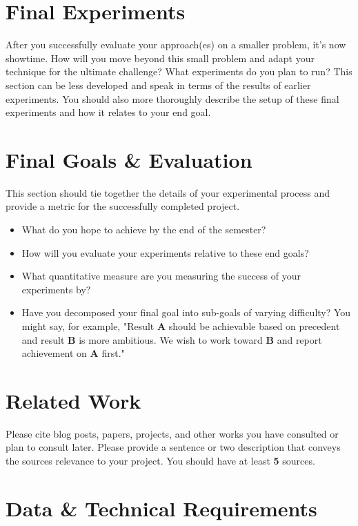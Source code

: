 \documentclass{article} %
\begin{document}
\section{Final Experiments}

After you successfully evaluate your approach(es) on a smaller problem, it's now showtime. How will you move beyond this small problem and adapt your technique for the ultimate challenge? What experiments do you plan to run? This section can be less developed and speak in terms of the results of earlier experiments. You should also more thoroughly describe the setup of these final experiments and how it relates to your end goal.

\section{Final Goals \& Evaluation}

This section should tie together the details of your experimental process and provide a metric for the successfully completed project.

\begin{itemize}
\item What do you hope to achieve by the end of the semester?
\item How will you evaluate your experiments relative to these end goals?
\item What quantitative measure are you measuring the success of your experiments by?
\item Have you decomposed your final goal into sub-goals of varying difficulty? You might say, for example, "Result \textbf{A} should be achievable based on precedent and result \textbf{B} is more ambitious. We wish to work toward \textbf{B} and report achievement on \textbf{A} first."
\end{itemize}

\section{Related Work}

Please cite blog posts, papers, projects, and other works you have consulted or plan to consult later. Please provide a sentence or two description that conveys the sources relevance to your project. You should have at least \textbf{5} sources.


\section{Data \& Technical Requirements}
\end{document}
